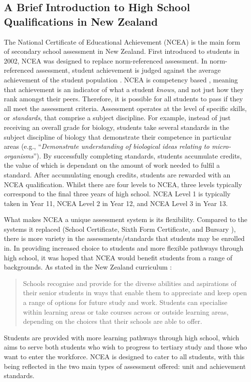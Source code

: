\subsection{A Brief Introduction to High School Qualifications in New Zealand}
The National Certificate of Educational Achievement (NCEA) is the main form of secondary school assessment in New Zealand. First introduced to students in 2002, NCEA was designed to replace norm-referenced assessment. In norm-referenced assessment, student achievement is judged against the average achievement of the student population \citep{Mahoney2005}. NCEA is competency based \citep{hipkins2016ncea}, meaning that achievement is an indicator of what a student \textit{knows}, and not just how they rank amongst their peers. Therefore, it is possible for all students to pass if they all meet the assessment criteria. Assessment operates at the level of specific skills, or \textit{standards}, that comprise a subject discipline. For example, instead of just receiving an overall grade for biology, students take several standards in the subject discipline of biology that demonstrate their competence in particular areas (e.g., ``\textit{Demonstrate understanding of biological ideas relating to micro-organisms}''). By successfully completing standards, students accumulate credits, the value of which is dependant on the amount of work needed to fulfil a standard. After accumulating enough credits, students are rewarded with an NCEA qualification. Whilst there are four levels to NCEA, three levels typically correspond to the final three years of high school. NCEA Level 1 is typically taken in Year 11, NCEA Level 2 in Year 12, and NCEA Level 3 in Year 13.

What makes NCEA a unique assessment system is its flexibility. Compared to the systems it replaced (School Certificate, Sixth Form Certificate, and Bursary \cite{Mahoney2005}), there is more variety in the assessments/standards that students may be enrolled in. In providing increased choice to students and more flexible pathways through high school, it was hoped that NCEA would benefit students from a range of backgrounds. As stated in the New Zealand curriculum \citep[p.41]{NZCurriculum2007}: \begin{quote}
Schools recognise and provide for the
diverse abilities and aspirations of their senior students in ways that enable them to appreciate and keep open a range of options for future study and work. Students can specialise within learning areas or take courses across or outside learning areas, depending on the choices that their schools are able to offer.
\end{quote}
Students are provided with more learning pathways through high school, which aims to serve both students who wish to progress to tertiary study and those who want to enter the workforce. NCEA is designed to cater to all students, with this being reflected in the two main types of assessment offered: unit and achievement standards. 

